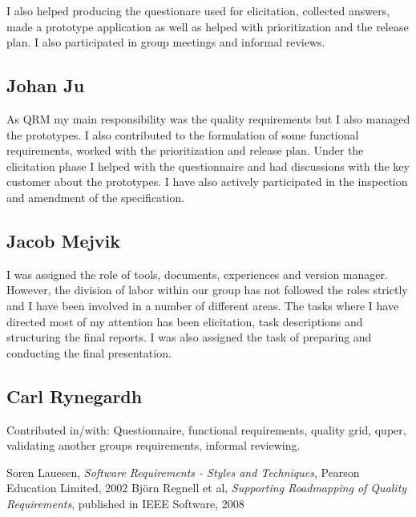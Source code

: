 \documentclass[10pt,a4paper]{article}
\begin{document}
I also helped producing the questionare used for elicitation, collected answers, made a prototype application as well as helped with prioritization and the release plan. I also participated in group meetings and informal reviews. 

\subsection{Johan Ju}
As QRM my main responsibility was the quality requirements but I also managed the prototypes. I also contributed to the formulation of some functional requirements, worked with the prioritization and release plan. Under the elicitation phase I helped with the questionnaire and had discussions with the key customer about the prototypes. I have also actively participated in the inspection and amendment of the specification.

\subsection{Jacob Mejvik}

I was assigned the role of tools, documents, experiences and version manager. However, the division of labor within our group has not followed the roles strictly and I have been involved in a number of different areas. The tasks where I have directed most of my attention has been elicitation, task descriptions and structuring the final reports. I was also assigned the task of preparing and conducting the final presentation. 


\subsection{Carl Rynegardh}
Contributed in/with: Questionnaire, functional requirements, quality grid, quper, validating another groups requirements, informal reviewing.

\begin{thebibliography}{99}
	Soren Lauesen,
  	\emph{Software Requirements - Styles and Techniques},
  	Pearson Education Limited, 2002
	Björn Regnell et al,
	\emph{Supporting Roadmapping of Quality Requirements},
	published in IEEE Software, 2008

\end{thebibliography}
\end{document}

